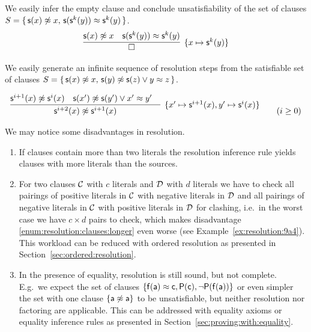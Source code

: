 \begin{example}\label{ex:xsx:skyssky}
	We easily infer the empty clause and
	conclude unsatisfiability of the set of clauses
	\( S = \{ \,
	{ \mathsf{s}(x)\not\approx x}, \,
	{ \mathsf{s}(\mathsf{s}^k(y))\approx\mathsf{s}^k(y) }
	 \, \} \).
	\begin{gather*}
	\infer[ \{ x\mapsto\msucc^k(y) \}]
	{
		\square
	}
	{
		\msucc(x)\mNE x & \msucc(\msucc^k(y))\mEQ\msucc^k(y)
	}
	\end{gather*}
\end{example}

\begin{example}\label{ex:sat:msxx:mymzyz}
	We easily generate an infinite sequence of resolution steps from the satisfiable set of clauses
	\(
		S =
		 \{ \,
		\mathsf{s}(x)\not\approx x, \, \mathsf{s}(y)\not\approx\mathsf{s}(z) \lor y\approx z
		 \, \}
	 \).

	\begin{gather*}
	\infer
	[ \{ x'\mapsto\msucc^{i+1}(x), y'\mapsto\msucc^{i}(x)\}]
	{
		\msucc^{i+2}(x) \mNE\msucc^{i+1}(x)
	}{
		\msucc^{i+1}(x)\mNE \msucc^i(x) & \msucc(x')\mNE\msucc(y')\lor x'\mEQ y'
		&
	}
	\tag{\( i\geq 0 \)}
	\end{gather*}
\end{example}

We may notice some disadvantages in resolution.

\begin{enumerate}
	\item\label{enum:resolution:clauses:longer}
	If clauses contain more than two literals the resolution inference rule
	yields clauses with more literals than the sources.

	\item\label{enum:resolution:clauses:multiple}
	For two clauses \( \mathcal{C} \) with \( c \) literals
	and \( \mathcal{D} \) with \( d \) literals
	we have to check all pairings
	of positive literals in \( \mathcal{C} \)
	with negative literals in \( \mathcal{D} \)
	and all pairings of negative literals in \( \mathcal{C} \)
	with positive literals in \( \mathcal{D} \) for clashing,
	i.e.~in the worst case we have \( c\times d \) pairs to check,
	which makes disadvantage \ref{enum:resolution:clauses:longer} even worse
	(see Example~\ref{ex:resolution:9a4}).
	This workload can be reduced with ordered resolution as presented
	in Section~\ref{sec:ordered:resolution}.

	\item In the presence of equality, resolution is still sound, but not complete.
	E.g.~we expect the set of clauses
	\( \{ \mathsf{f}(\mathsf{a}) \approx \mathsf{c}, \mathsf{P}(\mathsf{c}), \lnot\mathsf{P}(\mathsf{f}(\mathsf{a})) \} \)
	or even simpler the set with one clause
	\( \{ \mathsf{a}\not\approx\mathsf{a} \} \)
	to be unsatisfiable, but neither resolution nor factoring
	are applicable. This can be addressed with equality axioms or equality inference rules
	as presented in Section~\ref{sec:proving:with:equality}.
\end{enumerate}

